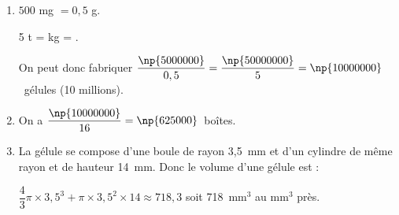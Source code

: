 
\medskip 

%
%
%
%

\begin{enumerate}
\item %

$500$ mg $= 0,5$ g.

5 t =  kg = .

On peut donc fabriquer $\dfrac{\np{5000000}}{0,5} = \dfrac{\np{50000000}}{5} = \np{10000000}$~gélules (10 millions). 
\item %
On a $\dfrac{\np{10000000}}{16} = \np{625000}$~boîtes. 
\item %

La gélule se compose d'une boule de rayon 3,5~mm et d'un cylindre de même rayon et de hauteur 14~mm. Donc le volume d'une gélule est :

$\dfrac{4}{3}\pi \times 3,5^3 + \pi\times 3,5^2 \times 14 \approx 718,3$ soit 718~mm$^3$ au mm$^3$ près. 
\end{enumerate}

\bigskip

